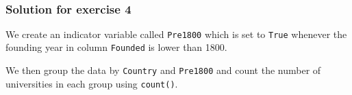 \documentclass{scrartcl}
\begin{document}
    \begin{center}
    \end{center}
    { \hspace*{\fill} \\}
    
    \hypertarget{solution-for-exercise-4}{%
\subsubsection{Solution for exercise 4}\label{solution-for-exercise-4}}

    We create an indicator variable called \texttt{Pre1800} which is set to
\texttt{True} whenever the founding year in column \texttt{Founded} is
lower than 1800.

We then group the data by \texttt{Country} and \texttt{Pre1800} and
count the number of universities in each group using \texttt{count()}.
\end{document}
